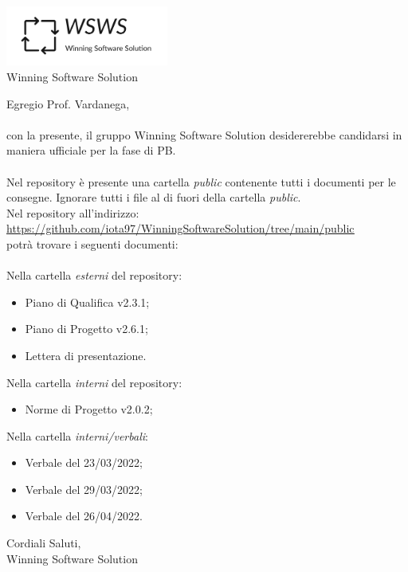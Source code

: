 \documentclass[a4paper, 12pt]{letter}
\begin{document}
\begin{center}
\includegraphics[width=0.4\textwidth]{WSWS-logos_transparent_crop}\\
{\Large Winning Software Solution}\\[24pt]
\end{center}
Egregio Prof. Vardanega,\\\\
con la presente, il gruppo Winning Software Solution desidererebbe candidarsi in maniera ufficiale
per la fase di PB.\\\\
Nel repository è presente una cartella \textit{public} contenente tutti i documenti per le consegne. Ignorare tutti i file
al di fuori della cartella \textit{public}.\\
Nel repository all'indirizzo: \\
\href{https://github.com/iota97/WinningSoftwareSolution/tree/main/public}{\underline{https://github.com/iota97/WinningSoftwareSolution/tree/main/public}}\\ 
potrà trovare i seguenti documenti:\\\\

Nella cartella \textit{esterni} del repository:
\begin{itemize}
\item Piano di Qualifica v2.3.1;
\item Piano di Progetto v2.6.1;
\item Lettera di presentazione.
\end{itemize}
Nella cartella \textit{interni} del repository:
\begin{itemize}
    \item Norme di Progetto v2.0.2;
\end{itemize}

Nella cartella \textit{interni/verbali}:
\begin{itemize}
    \item Verbale del 23/03/2022;
    \item Verbale del 29/03/2022;
    \item Verbale del 26/04/2022.
\end{itemize}
\begin{flushright}
Cordiali Saluti,\\
Winning Software Solution
\end{flushright}
\end{document}
